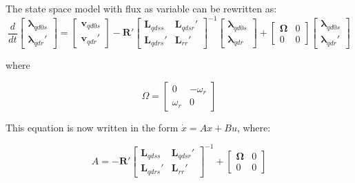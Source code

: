 The state space model with flux as variable can be rewritten as:
\begin{equation}
  \frac{d}{dt}
  \begin{bmatrix}
    \boldsymbol{\lambda}_{qd0s} \\
    \boldsymbol{\lambda}_{qdr}'
  \end{bmatrix}
  =
  \begin{bmatrix}
    \mathbf{v}_{qd0s} \\
    \mathbf{v}_{qdr}'
  \end{bmatrix}
  - \mathbf{R}'
  \begin{bmatrix}
    \mathbf{L}_{qdss} & \mathbf{L}_{qdsr}' \\
    \mathbf{L}_{qdrs}' & \mathbf{L}_{rr}'    
  \end{bmatrix}^{-1}
  \begin{bmatrix}
    \boldsymbol{\lambda}_{qd0s} \\
    \boldsymbol{\lambda}_{qdr}
  \end{bmatrix}
  +  
  \begin{bmatrix}
    \mathbf{\Omega} & 0 \\
    0 & 0 
  \end{bmatrix}
  \begin{bmatrix}
    \boldsymbol{\lambda}_{qd0s} \\
    \boldsymbol{\lambda}_{qdr}'
  \end{bmatrix}
\end{equation}
%

where

\begin{equation}
\Omega =
\begin{bmatrix}
0 & -\omega_r \\
\omega_r & 0
\end{bmatrix}
\end{equation}

This equation is now written in the form $\dot{x} = Ax + Bu$, where:

\begin{equation}
A = -\mathbf{R}'
\begin{bmatrix}
    \mathbf{L}_{qdss} & \mathbf{L}_{qdsr}' \\
    \mathbf{L}_{qdrs}' & \mathbf{L}_{rr}' 
\end{bmatrix}^{-1}
+
  \begin{bmatrix}
    \mathbf{\Omega} & 0 \\
    0 & 0 
  \end{bmatrix}
\end{equation}

